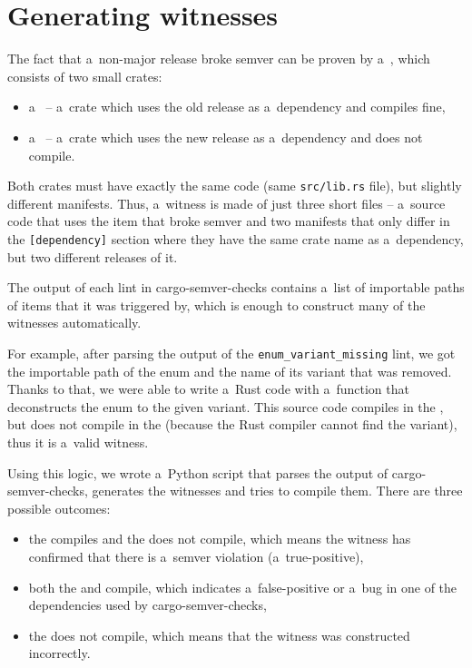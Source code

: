 \documentclass[licencjacka,en]{pracamgr}
\begin{document}
\section{Generating witnesses}\label{r:section_generating_witnesses}

The fact that a~non-major release broke semver can be proven by a~,
which consists of two small crates:
\begin{itemize}
	\item a~ -- a~crate which uses the old release as a~dependency
		and compiles fine,
	\item a~ -- a~crate which uses the new release as a~dependency
		and does not compile.
\end{itemize}
Both crates must have exactly the same code (same \texttt{src/lib.rs} file),
but slightly different manifests.
Thus, a~witness is made of just three short files -- a~source code that uses the item that
broke semver and two manifests that only differ in the \texttt{[dependency]} section
where they have the same crate name as a~dependency, but two different releases of it.

The output of each lint in cargo-semver-checks contains a~list of importable paths
of items that it was triggered by, which is enough to construct many of
the witnesses automatically.

For example, after parsing the output of the \texttt{enum\_variant\_missing} lint,
we got the importable path of the enum and the name of its variant that was removed.
Thanks to that, we were able to write a~Rust code with a~function that deconstructs the enum
to the given variant. This source code compiles in the , but does not compile
in the  (because the Rust compiler cannot find the variant), thus it is
a~valid witness.

Using this logic, we wrote a~Python script that parses the output of cargo-semver-checks,
generates the witnesses and tries to compile them.
There are three possible outcomes:
\begin{itemize}
	\item the  compiles and the  does not compile, which means
		the witness has confirmed that there is a~semver violation (a~true-positive),
	\item both the  and  compile, which indicates a~false-positive
		or a~bug in one of the dependencies used by cargo-semver-checks,
	\item the  does not compile, which means that the witness
		was constructed incorrectly.
\end{itemize}
\end{document}
